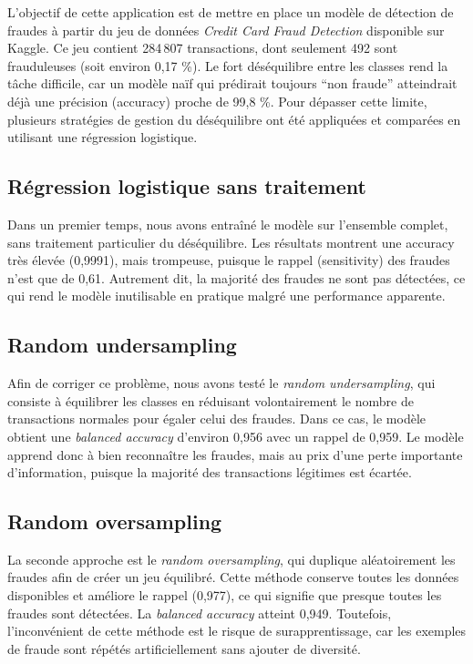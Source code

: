 \documentclass[a4paper,12pt]{article}
\begin{document}
L’objectif de cette application est de mettre en place un modèle de détection de fraudes à partir du jeu de données \textit{Credit Card Fraud Detection} disponible sur Kaggle.
Ce jeu contient 284\,807 transactions, dont seulement 492 sont frauduleuses (soit environ 0,17 \%).
Le fort déséquilibre entre les classes rend la tâche difficile, car un modèle naïf qui prédirait toujours ``non fraude'' atteindrait déjà une précision (accuracy) proche de 99,8 \%.
Pour dépasser cette limite, plusieurs stratégies de gestion du déséquilibre ont été appliquées et comparées en utilisant une régression logistique.

\subsection*{Régression logistique sans traitement}
Dans un premier temps, nous avons entraîné le modèle sur l’ensemble complet, sans traitement particulier du déséquilibre.
Les résultats montrent une accuracy très élevée (0,9991), mais trompeuse, puisque le rappel (sensitivity) des fraudes n’est que de 0,61.
Autrement dit, la majorité des fraudes ne sont pas détectées, ce qui rend le modèle inutilisable en pratique malgré une performance apparente.

\subsection*{Random undersampling}
Afin de corriger ce problème, nous avons testé le \textit{random undersampling}, qui consiste à équilibrer les classes en réduisant volontairement le nombre de transactions normales pour égaler celui des fraudes.
Dans ce cas, le modèle obtient une \textit{balanced accuracy} d’environ 0,956 avec un rappel de 0,959.
Le modèle apprend donc à bien reconnaître les fraudes, mais au prix d’une perte importante d’information, puisque la majorité des transactions légitimes est écartée.

\subsection*{Random oversampling}
La seconde approche est le \textit{random oversampling}, qui duplique aléatoirement les fraudes afin de créer un jeu équilibré.
Cette méthode conserve toutes les données disponibles et améliore le rappel (0,977), ce qui signifie que presque toutes les fraudes sont détectées.
La \textit{balanced accuracy} atteint 0,949.
Toutefois, l’inconvénient de cette méthode est le risque de surapprentissage, car les exemples de fraude sont répétés artificiellement sans ajouter de diversité.
\end{document}
